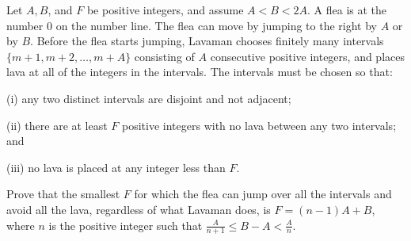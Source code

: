 Let $A, B$,  and $F$ be positive integers, and assume $A < B < 2A$. A flea is at the number $0$ on the number line. The flea can move by jumping to the right by $A$ or by $B$. Before the flea starts jumping, Lavaman chooses finitely many intervals $\{m+1, m+2, \ldots, m+A\}$ consisting of $A$ consecutive positive integers, and places lava at all of the integers in the intervals. The intervals must be chosen so that:

(i) any two distinct intervals are disjoint and not adjacent;

(ii) there are at least $F$ positive integers with no lava between any two intervals; and

(iii) no lava is placed at any integer less than $F$.

Prove that the smallest $F$ for which the flea can jump over all the intervals and avoid all the lava, regardless of what Lavaman does, is $F = (n-1)A + B$,  where $n$ is the positive integer such that $\frac{A}{n+1} \le B-A < \frac{A}{n}$.